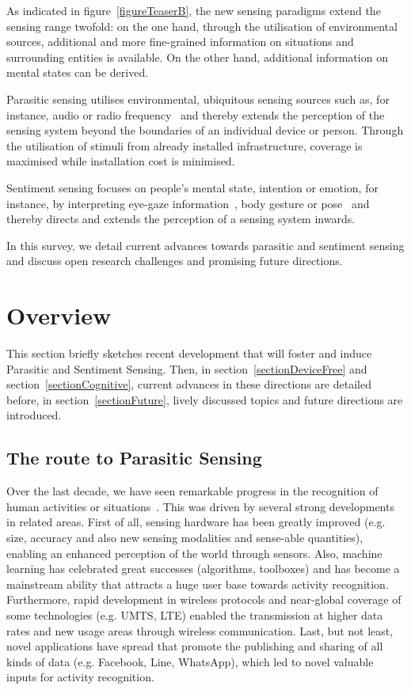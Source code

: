 \documentclass[journal]{IEEEtran}
\begin{document}
As indicated in figure~\ref{figureTeaserB}, the new sensing paradigms extend the sensing range twofold: on the one hand, through the utilisation of environmental sources, additional and more fine-grained information on situations and surrounding entities is available. 
On the other hand, additional information on mental states can be derived. 

Parasitic sensing utilises environmental, ubiquitous sensing sources such as, for instance, audio or radio frequency~\cite{RFsensing_Pu_2013,Pervasive_Adib_2013,Cryptography_Schuerman_2011,Cryptography_Madiseh_2008} and thereby extends the perception of the sensing system beyond the boundaries of an individual device or person. 
Through the utilisation of stimuli from already installed infrastructure, coverage is maximised while installation cost is minimised.

Sentiment sensing focuses on people's mental state, intention or emotion, for instance, by interpreting eye-gaze information~\cite{Pervasive_Ishimaru_2014,Pervasive_Kunze_2013}, body gesture or pose~\cite{Pervasive_Castellano_2008,Pervasive_Jaggarwal_2012} and thereby directs and extends the perception of a sensing system inwards.

In this survey, we detail current advances towards parasitic and sentiment sensing and discuss open research challenges and promising future directions.
 \section{Overview}
This section briefly sketches recent development that will foster and induce Parasitic and Sentiment Sensing.
Then, in section~\ref{sectionDeviceFree} and section~\ref{sectionCognitive}, current advances in these directions are detailed before, in section~\ref{sectionFuture}, lively discussed topics and future directions are introduced.

\subsection{The route to Parasitic Sensing}
Over the last decade, we have seen remarkable progress in the recognition of human activities or situations~\cite{Pervasive_Roggen_2009,Pervasive_Cheng_2013,Pervasive_Chen_2012,Pervasive_Chen_2012-2}.
This was driven by several strong developments in related areas.
First of all, sensing hardware has been greatly improved (e.g. size, accuracy and also new sensing modalities and sense-able quantities), enabling an enhanced perception of the world through sensors.
Also, machine learning has celebrated great successes (algorithms, toolboxes) and has become a mainstream ability that attracts a huge user base towards activity recognition.
Furthermore, rapid development in wireless protocols and near-global coverage of some technologies (e.g. UMTS, LTE) enabled the transmission at higher data rates and new usage areas through wireless communication.
Last, but not least, novel applications have spread that promote the publishing and sharing of all kinds of data (e.g. Facebook, Line, WhatsApp), which led to novel valuable inputs for activity recognition.
\end{document}
